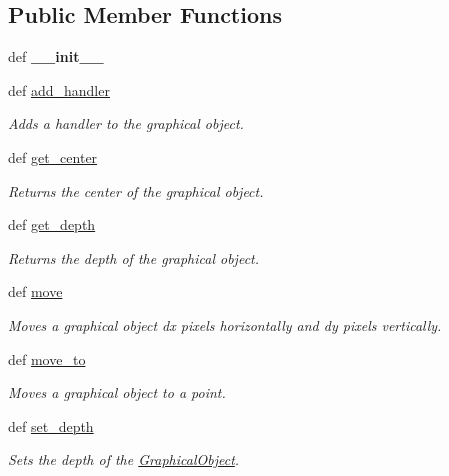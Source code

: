 \subsection*{Public Member Functions}
\begin{DoxyCompactItemize}
\item 
\hypertarget{classcs110graphics_1_1GraphicalObject_a1c84a127a5d1cae5802e326b9b024140}{
def {\bfseries \_\-\_\-init\_\-\_\-}}
\label{classcs110graphics_1_1GraphicalObject_a1c84a127a5d1cae5802e326b9b024140}

\item 
def \hyperlink{classcs110graphics_1_1GraphicalObject_adb1af0d5a6baae3f9a08d21a3227c49f}{add\_\-handler}
\begin{DoxyCompactList}\small\item\em Adds a handler to the graphical object. \item\end{DoxyCompactList}\item 
def \hyperlink{classcs110graphics_1_1GraphicalObject_a062789c4cc9de38af32dcc4ff2058607}{get\_\-center}
\begin{DoxyCompactList}\small\item\em Returns the center of the graphical object. \item\end{DoxyCompactList}\item 
def \hyperlink{classcs110graphics_1_1GraphicalObject_a6d9f5718cd0cf249e0d2842971bae17f}{get\_\-depth}
\begin{DoxyCompactList}\small\item\em Returns the depth of the graphical object. \item\end{DoxyCompactList}\item 
def \hyperlink{classcs110graphics_1_1GraphicalObject_aa64d270fb83efa4a54e1a7953512f9cd}{move}
\begin{DoxyCompactList}\small\item\em Moves a graphical object dx pixels horizontally and dy pixels vertically. \item\end{DoxyCompactList}\item 
def \hyperlink{classcs110graphics_1_1GraphicalObject_abe2d480265df7ac9447205c52c6946df}{move\_\-to}
\begin{DoxyCompactList}\small\item\em Moves a graphical object to a point. \item\end{DoxyCompactList}\item 
def \hyperlink{classcs110graphics_1_1GraphicalObject_a20d76d4ee4419c3065d61deb6cbc6700}{set\_\-depth}
\begin{DoxyCompactList}\small\item\em Sets the depth of the \hyperlink{classcs110graphics_1_1GraphicalObject}{GraphicalObject}. \item\end{DoxyCompactList}\end{DoxyCompactItemize}


